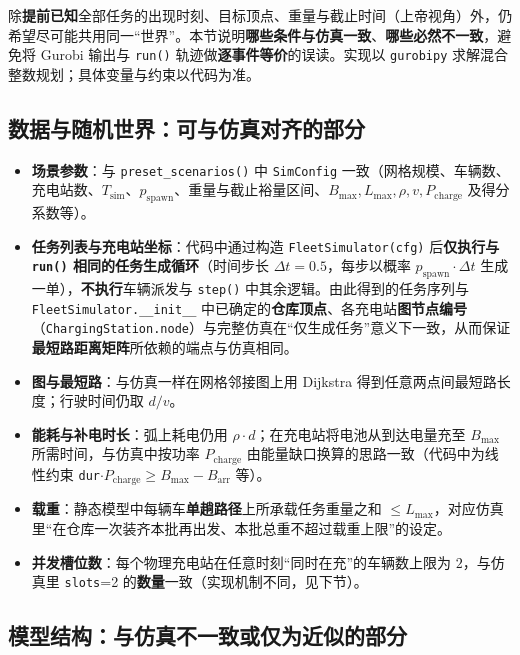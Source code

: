 \documentclass[UTF8,a4paper]{ctexart}
\begin{document}
除\textbf{提前已知}全部任务的出现时刻、目标顶点、重量与截止时间（上帝视角）外，仍希望尽可能共用同一“世界”。本节说明\textbf{哪些条件与仿真一致}、\textbf{哪些必然不一致}，避免将 Gurobi 输出与 \texttt{run()} 轨迹做\textbf{逐事件等价}的误读。实现以 \texttt{gurobipy} 求解混合整数规划；具体变量与约束以代码为准。

\subsection{数据与随机世界：可与仿真对齐的部分}

\begin{itemize}
  \item \textbf{场景参数}：与 \texttt{preset\_scenarios()} 中 \texttt{SimConfig} 一致（网格规模、车辆数、充电站数、$T_{\mathrm{sim}}$、$p_{\mathrm{spawn}}$、重量与截止裕量区间、$B_{\max},L_{\max},\rho,v,P_{\mathrm{charge}}$ 及得分系数等）。
  \item \textbf{任务列表与充电站坐标}：代码中通过构造 \texttt{FleetSimulator(cfg)} 后\textbf{仅执行与 \texttt{run()} 相同的任务生成循环}（时间步长 $\Delta t=0.5$，每步以概率 $p_{\mathrm{spawn}}\cdot\Delta t$ 生成一单），\textbf{不执行}车辆派发与 \texttt{step()} 中其余逻辑。由此得到的任务序列与 \texttt{FleetSimulator.\_\_init\_\_} 中已确定的\textbf{仓库顶点}、各充电站\textbf{图节点编号}（\texttt{ChargingStation.node}）与完整仿真在“仅生成任务”意义下一致，从而保证\textbf{最短路距离矩阵}所依赖的端点与仿真相同。
  \item \textbf{图与最短路}：与仿真一样在网格邻接图上用 Dijkstra 得到任意两点间最短路长度；行驶时间仍取 $d/v$。
  \item \textbf{能耗与补电时长}：弧上耗电仍用 $\rho\cdot d$；在充电站将电池从到达电量充至 $B_{\max}$ 所需时间，与仿真中按功率 $P_{\mathrm{charge}}$ 由能量缺口换算的思路一致（代码中为线性约束 \texttt{dur}$\cdot P_{\mathrm{charge}}\ge B_{\max}-B_{\mathrm{arr}}$ 等）。
  \item \textbf{载重}：静态模型中每辆车\textbf{单趟路径}上所承载任务重量之和 $\le L_{\max}$，对应仿真里“在仓库一次装齐本批再出发、本批总重不超过载重上限”的设定。
  \item \textbf{并发槽位数}：每个物理充电站在任意时刻“同时在充”的车辆数上限为 $2$，与仿真里 \texttt{slots}=2 的\textbf{数量}一致（实现机制不同，见下节）。
\end{itemize}

\subsection{模型结构：与仿真不一致或仅为近似的部分}
\end{document}
